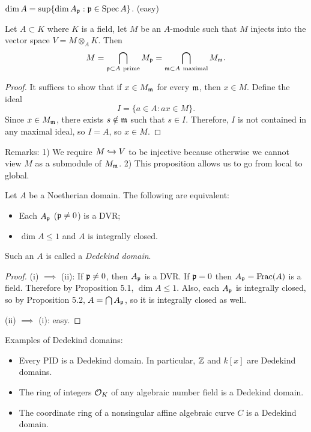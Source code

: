 \documentclass[11pt]{amsart}
\begin{document}
\begin{prop}
$\dim A = \sup \{\dim A_{\mathfrak{p}}: \mathfrak{p} \in \operatorname{Spec} A\}$. (easy)
\end{prop}

\begin{prop}
Let $A\subset K$ where $K$ is a field, let $M$ be an $A$-module such that $M$ injects into the vector space $V = M\otimes_A K$. Then 
\[M = \bigcap_{\fp\subset A \mathrm{\ prime}} M_{\fp} = \bigcap_{\fm\subset A \mathrm{\ maximal}} M_{\fm}.\]
\end{prop}

\begin{proof}
It suffices to show that if $x\in M_{\mathfrak{m}}$ for every $\mathfrak{m}$, then $x\in M$. Define the ideal
\[I = \{a\in A: ax\in M\}.\]
Since $x\in M_{\mathfrak{m}}$, there exists $s\notin \mathfrak{m}$ such that $s\in I$. Therefore, $I$ is not contained in any maximal ideal, so $I = A$, so $x\in M$.
\end{proof}

Remarks: 1) We require $M\hookrightarrow V$ to be injective because otherwise we cannot view $M$ as a submodule of $M_{\mathfrak{m}}$. 2) This proposition allows us to go from local to global.

\begin{prop}
Let $A$ be a Noetherian domain. The following are equivalent:

\begin{itemize}
    \item Each $A_{\mathfrak{p}}$ ($\mathfrak{p}\neq 0$) is a DVR;
    \item $\dim A\le 1$ and $A$ is integrally closed.
\end{itemize}

Such an $A$ is called a \emph{Dedekind domain}.
\end{prop}

\begin{proof}
(i) $\implies$ (ii): If $\mathfrak{p}\neq 0$, then $A_{\mathfrak{p}}$ is a DVR. If $\mathfrak{p} = 0$ then $A_{\mathfrak{p}} = \operatorname{Frac}(A)$ is a field. Therefore by Proposition 5.1, $\dim A \le 1$. Also, each $A_{\mathfrak{p}}$ is integrally closed, so by Proposition 5.2, $A = \bigcap A_{\mathfrak{p}}$, so it is integrally closed as well.

(ii) $\implies$ (i): easy.
\end{proof}

Examples of Dedekind domains:
\begin{itemize}
    \item Every PID is a Dedekind domain. In particular, $\mathbb{Z}$ and $k[x]$ are Dedekind domains.
    \item The ring of integers $\mathcal{O}_K$ of any algebraic number field is a Dedekind domain.
    \item The coordinate ring of a nonsingular affine algebraic curve $C$ is a Dedekind domain.
\end{itemize}
\end{document}
